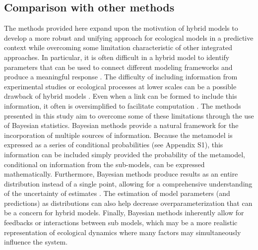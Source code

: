 \documentclass[11pt]{article}
\begin{document}
\subsection*{Comparison with other methods}
The methods provided here expand upon the motivation of hybrid models to develop a more robust and unifying approach for ecological models in a predictive context while overcoming some limitation characteristic of other integrated approaches.
In particular, it is often difficult in a hybrid model to identify parameters that can be used to connect different modeling frameworks and produce a meaningful response \citep{Thuiller2013}. 
The difficulty of including information from experimental studies or ecological processes at lower scales can be a possible drawback of hybrid models \citep{Thuiller2008, Smolik2010, Thuiller2014a}. 
Even when a link can be formed to include this information, it often is oversimplified to facilitate computation \citep{Gallien2010}. 
The methods presented in this study aim to overcome some of these limitations through the use of Bayesian statistics.
Bayesian methods provide a natural framework for the incorporation of multiple sources of information.
Because the metamodel is expressed as a series of conditional probabilities (see Appendix S1), this information can be included simply provided the probability of the metamodel, conditional on information from the sub-models, can be expressed mathematically.
Furthermore, Bayesian methods produce results as an entire distribution instead of a single point, allowing for a comprehensive understanding of the uncertainty of estimates \citep{Link2010}. 
The estimation of model parameters (and predictions) as distributions can also help decrease overparameterization that can be a concern for hybrid models. 
Finally, Bayesian methods inherently allow for feedbacks or interactions between sub models, which may be a more realistic representation of ecological dynamics where many factors may simultaneously influence the system.
\end{document}
